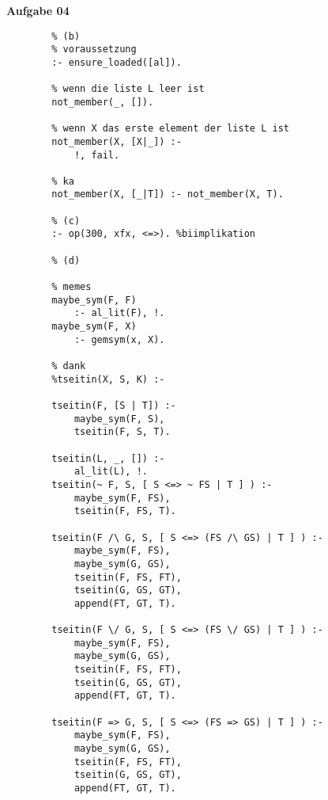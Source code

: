 \documentclass[a4paper,10pt]{article}
\begin{document}
	\textbf{Aufgabe 04}
	\begin{compactenum} [a)]
		\item 
		\item \begin{verbatim}
		% (b)
		% voraussetzung
		:- ensure_loaded([al]).
		
		% wenn die liste L leer ist
		not_member(_, []).
		
		% wenn X das erste element der liste L ist
		not_member(X, [X|_]) :- 
			!, fail.
		
		% ka
		not_member(X, [_|T]) :- not_member(X, T).
		
		% (c)
		:- op(300, xfx, <=>). %biimplikation
		
		% (d)
		
		% memes
		maybe_sym(F, F) 
			:- al_lit(F), !.
		maybe_sym(F, X) 
			:- gemsym(x, X).
		
		% dank
		%tseitin(X, S, K) :-
		
		tseitin(F, [S | T]) :-
			maybe_sym(F, S),
			tseitin(F, S, T).
		
		tseitin(L, _, []) :- 
			al_lit(L), !.
		tseitin(~ F, S, [ S <=> ~ FS | T ] ) :-
			maybe_sym(F, FS),
			tseitin(F, FS, T).
		
		tseitin(F /\ G, S, [ S <=> (FS /\ GS) | T ] ) :-
			maybe_sym(F, FS),
			maybe_sym(G, GS),
			tseitin(F, FS, FT),
			tseitin(G, GS, GT),
			append(FT, GT, T).
		
		tseitin(F \/ G, S, [ S <=> (FS \/ GS) | T ] ) :-
			maybe_sym(F, FS),
			maybe_sym(G, GS),
			tseitin(F, FS, FT),
			tseitin(G, GS, GT),
			append(FT, GT, T).
		
		tseitin(F => G, S, [ S <=> (FS => GS) | T ] ) :-
			maybe_sym(F, FS),
			maybe_sym(G, GS),
			tseitin(F, FS, FT),
			tseitin(G, GS, GT),
			append(FT, GT, T).
		\end{verbatim}
		\item \begin{verbatim}
		\end{verbatim}
		\item \begin{verbatim}
		\end{verbatim}
		\end{compactenum}
\end{document}
